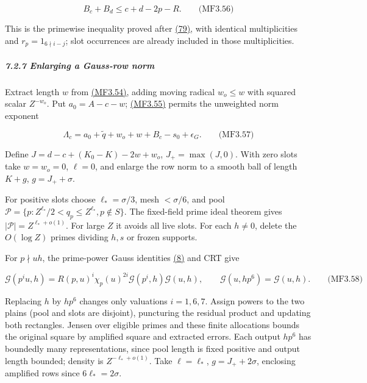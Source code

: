 \hypertarget{mf:eq:B3.56}{}

\label{mf:eq:B3.56}

\[
B_c+B_d\le c+d-2p-R.
\qquad\text{(MF3.56)}
\]

This is the primewise inequality proved after \protect\hyperlink{cf:eq:D.15}{(79)}, with identical multiplicities and \(r_p=1_{6\nmid i-j}\); slot occurrences are already included in those multiplicities.

\hypertarget{enlarging-a-gauss-row-norm}{}

\label{enlarging-a-gauss-row-norm}

\hypertarget{enlarging-a-gauss-row-norm-heading-2}{%
\subparagraph{7.2.7 Enlarging a Gauss-row norm}}

Extract length \(w\) from \protect\hyperlink{mf:eq:B3.54}{(MF3.54)}, adding moving radical \(w_o\le w\) with squared scalar \(Z^{-w_o}\). Put \(a_0=A-c-w\); \protect\hyperlink{mf:eq:B3.55}{(MF3.55)} permits the unweighted norm exponent

\hypertarget{mf:eq:B3.57}{}

\label{mf:eq:B3.57}

\[
\Lambda_c=a_0+\widetilde q+w_o+w+B_c-s_0+\epsilon_G.
\qquad\text{(MF3.57)}
\]

Define \(J=d-c+(K_0-K)-2w+w_o\), \(J_+=\max(J,0)\). With zero slots take \(w=w_o=0\), \(\ell=0\), and enlarge the row norm to a smooth ball of length \(K+g\), \(g=J_++\sigma\).

For positive slots choose \(\ell_* =\sigma/3\), mesh \(<\sigma/6\), and pool \(\mathcal P=\{p:Z^{\ell_*}/2<q_p\le Z^{\ell_*},p\notin S\}\). The fixed-field prime ideal theorem gives \(|\mathcal P|=Z^{\ell_*+o(1)}\). For large \(Z\) it avoids all live slots. For each \(h\ne0\), delete the \(O(\log Z)\) primes dividing \(h,s\) or frozen supports.

For \(p\nmid uh\), the prime-power Gauss identities \protect\hyperlink{cf:eq:A.12}{(8)} and CRT give

\hypertarget{mf:eq:B3.58}{}

\label{mf:eq:B3.58}

\[
\mathcal G(p^iu,h)=R(p,u)^i\chi_p(u)^{2i}\mathcal G(p^i,h)\mathcal G(u,h),
\qquad\mathcal G(u,hp^6)=\mathcal G(u,h).
\qquad\text{(MF3.58)}
\]

Replacing \(h\) by \(hp^6\) changes only valuations \(i=1,6,7\). Assign powers to the two plains (pool and slots are disjoint), puncturing the residual product and updating both rectangles. Jensen over eligible primes and these finite allocations bounds the original square by amplified square and extracted errors. Each output \(hp^6\) has boundedly many representations, since pool length is fixed positive and output length bounded; density is \(Z^{-\ell_*+o(1)}\). Take \(\ell=\ell_*\), \(g=J_++2\sigma\), enclosing amplified rows since \(6\ell_*=2\sigma\).


